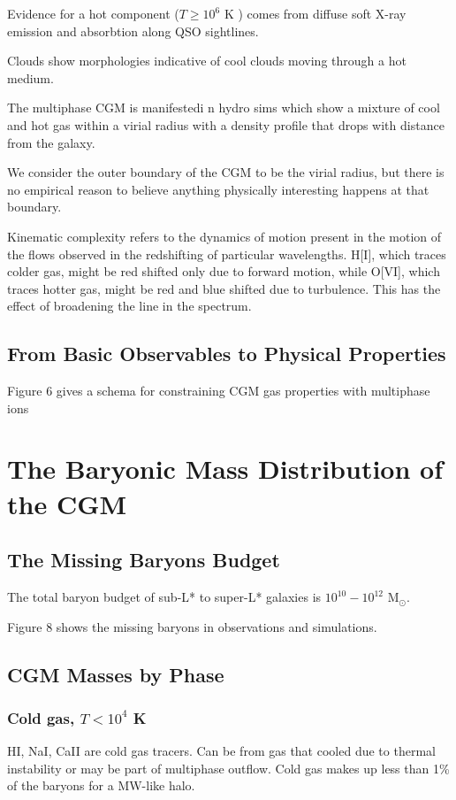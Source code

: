 \documentclass[12pt]{article}
\begin{document}
Evidence for a hot component ($T \geq 10^6$ K ) comes from diffuse soft X-ray emission and absorbtion along QSO sightlines. 

Clouds show morphologies indicative of cool clouds moving through a hot medium.

The multiphase CGM is manifestedi n hydro sims which show a mixture of cool and hot gas within a virial radius with a density profile that drops with distance from the galaxy.

We consider the outer boundary of the CGM to be the virial radius, but there is no empirical reason to believe anything physically interesting happens at that boundary. 

Kinematic complexity refers to the dynamics of motion present in the motion of the flows observed in the redshifting of particular wavelengths. H[I], which traces
colder gas, might be red shifted only due to forward motion, while O[VI], which traces hotter gas, might be red and blue shifted due to turbulence. This has the effect
of broadening the line in the spectrum. 

\subsection{From Basic Observables to Physical Properties}

Figure 6 gives a schema for constraining CGM gas properties with multiphase ions


\section{The Baryonic Mass Distribution of the CGM}
\subsection{The Missing Baryons Budget}

The total baryon budget of sub-L* to super-L* galaxies is $10^{10} - 10^{12}$ M$_\odot$.

Figure 8 shows the missing baryons in observations and simulations.

\subsection{CGM Masses by Phase}

\subsubsection{Cold gas, $T<10^4$ K}
HI, NaI, CaII are cold gas tracers. Can be from gas that cooled due to thermal instability or may be part of multiphase outflow. Cold gas makes up less than 1\% of the baryons
for a MW-like halo.
\end{document}
